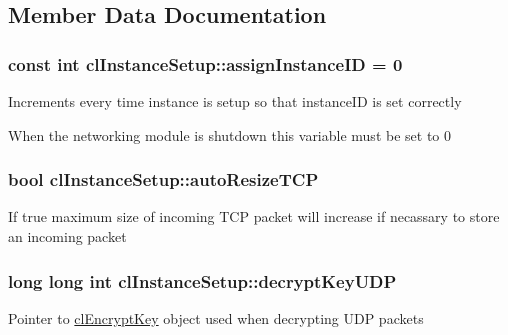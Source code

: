 \subsection{Member Data Documentation}
\hypertarget{classcl_instance_setup_abfe57f0506bbc15ac6ff7e045ccb9b6d}{
\subsubsection[{assignInstanceID}]{\setlength{\rightskip}{0pt plus 5cm}const int {\bf clInstanceSetup::assignInstanceID} = 0}}
\label{classcl_instance_setup_abfe57f0506bbc15ac6ff7e045ccb9b6d}
Increments every time instance is setup so that {\ttfamily instanceID} is set correctly \par
 When the networking module is shutdown this variable must be set to 0 \hypertarget{classcl_instance_setup_a6c8317c2c68452633ce0b16f22f52ded}{
\subsubsection[{autoResizeTCP}]{\setlength{\rightskip}{0pt plus 5cm}bool {\bf clInstanceSetup::autoResizeTCP}}}
\label{classcl_instance_setup_a6c8317c2c68452633ce0b16f22f52ded}
If true maximum size of incoming TCP packet will increase if necassary to store an incoming packet \hypertarget{classcl_instance_setup_a376b285bccbb1c1400bcceea53bd8dda}{
\subsubsection[{decryptKeyUDP}]{\setlength{\rightskip}{0pt plus 5cm}long long int {\bf clInstanceSetup::decryptKeyUDP}}}
\label{classcl_instance_setup_a376b285bccbb1c1400bcceea53bd8dda}
Pointer to \hyperlink{classcl_encrypt_key}{clEncryptKey} object used when decrypting UDP packets \par
